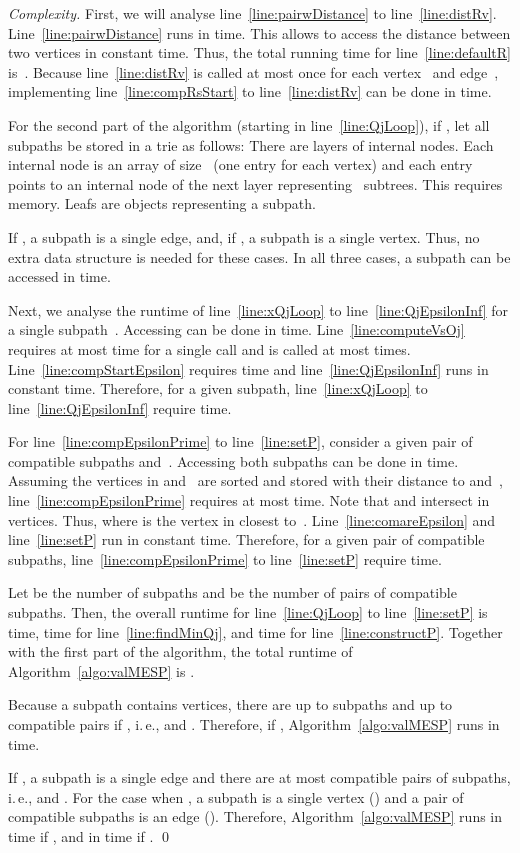 \documentclass[10pt]{llncs}
\makeatletter
\newcommand{\ie}{i.\,e.\@ifnextchar{,}{}{~}}
\makeatother
\begin{document}
\begin{proof}
    [Complexity]
First, we will analyse line~\ref{line:pairwDistance} to line~\ref{line:distRv}.
Line~\ref{line:pairwDistance} runs in  time.
This allows to access the distance between two vertices in constant time.
Thus, the total running time for line~\ref{line:defaultR} is~.
Because line~\ref{line:distRv} is called at most once for each vertex~ and edge~, implementing line~\ref{line:compRsStart} to line~\ref{line:distRv} can be done in  time.

For the second part of the algorithm (starting in line~\ref{line:QjLoop}), if , let all subpaths be stored in a trie as follows:
There are  layers of internal nodes.
Each internal node is an array of size~ (one entry for each vertex) and each entry points to an internal node of the next layer representing ~subtrees.
This requires  memory.
Leafs are objects representing a subpath.

If , a subpath is a single edge, and, if , a subpath is a single vertex.
Thus, no extra data structure is needed for these cases.
In all three cases, a subpath can be accessed in  time.

Next, we analyse the runtime of line~\ref{line:xQjLoop} to line~\ref{line:QjEpsilonInf} for a single subpath~.
Accessing  can be done in  time.
Line~\ref{line:computeVsOj} requires at most  time for a single call and is called at most  times.
Line~\ref{line:compStartEpsilon} requires  time and line~\ref{line:QjEpsilonInf} runs in constant time.
Therefore, for a given subpath, line~\ref{line:xQjLoop} to line~\ref{line:QjEpsilonInf} require  time.

For line~\ref{line:compEpsilonPrime} to line~\ref{line:setP}, consider a given pair of compatible subpaths  and~.
Accessing both subpaths can be done in  time.
Assuming the vertices in  and~ are sorted and stored with their distance to  and~, line~\ref{line:compEpsilonPrime} requires at most  time.
Note that  and  intersect in  vertices.
Thus,  where  is the vertex in  closest to~.
Line~\ref{line:comareEpsilon} and line~\ref{line:setP} run in constant time.
Therefore, for a given pair of compatible subpaths, line~\ref{line:compEpsilonPrime} to line~\ref{line:setP} require  time.

Let  be the number of subpaths and  be the number of pairs of compatible subpaths.
Then, the overall runtime for line~\ref{line:QjLoop} to line~\ref{line:setP} is  time,  time for line~\ref{line:findMinQj}, and  time for line~\ref{line:constructP}.
Together with the first part of the algorithm, the total runtime of Algorithm~\ref{algo:valMESP} is .

Because a subpath contains  vertices, there are up to  subpaths and up to  compatible pairs if , \ie,  and .
Therefore, if , Algorithm~\ref{algo:valMESP} runs in  time.

If , a subpath is a single edge and there are at most  compatible pairs of subpaths, \ie,  and .
For the case when , a subpath is a single vertex () and a pair of compatible subpaths is an edge ().
Therefore, Algorithm~\ref{algo:valMESP} runs in  time if , and in  time if .
\qed
\end{proof}
\end{document}
